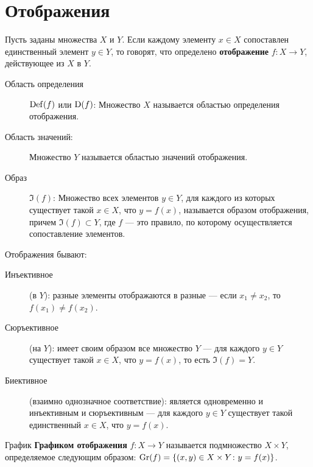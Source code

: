 \section{Отображения}

\begin{definition}{}{}
    Пусть заданы множества $X$ и $Y$. Если каждому элементу $x \in X$ сопоставлен единственный элемент $y \in Y$,
    то говорят, что определено \textbf{отображение} $f \colon X \to Y$, действующее из $X$ в $Y$.
\end{definition}

\begin{description}
    \item [Область определения] $\operatorname{Def}(f)$ или $\operatorname{D}(f)$: Множество $X$ называется областью определения отображения.
    \item [Область значений:] Множество $Y$ называется областью значений отображения.
    \item [Образ] $\Im(f)$: Множество всех элементов $y \in Y$, для каждого из которых существует такой $x \in X$,
            что $y = f(x)$, называется образом отображения, причем $\Im(f) \subset Y$,
            где $f$ --- это правило, по которому осуществляется сопоставление элементов.
\end{description}

Отображения бывают:
\begin{description}
    \item[Инъективное] (в $Y$): разные элементы отображаются в разные ---
        если $x_1 \neq x_2$, то $f(x_1) \neq f(x_2)$.
    \item[Сюръективное] (на $Y$): имеет своим образом все множество $Y$ ---
        для каждого $y \in Y$ существует такой $x \in X$, что $y = f(x)$, то есть $\Im(f) = Y$.
    \item[Биективное] (взаимно однозначное соответствие): является одновременно и инъективным и сюръективным ---
        для каждого $y \in Y$ существует такой единственный $x \in X$, что $y = f(x)$.
\end{description}

\begin{definition}{График}{}
    \textbf{Графиком отображения} $f \colon X \to Y$ называется подмножество $X \times Y$,
    определяемое следующим образом:
    $\operatorname{Gr}(f) = \{ (x, y) \in X \times Y \colon y = f(x) \}$.
\end{definition}
